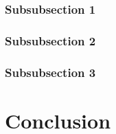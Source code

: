 \documentclass[12pt]{article} %
\begin{document}
\subsubsection{Subsubsection 1} %



\subsubsection{Subsubsection 2} %



\subsubsection{Subsubsection 3} %













\section{Conclusion} %
\end{document}
